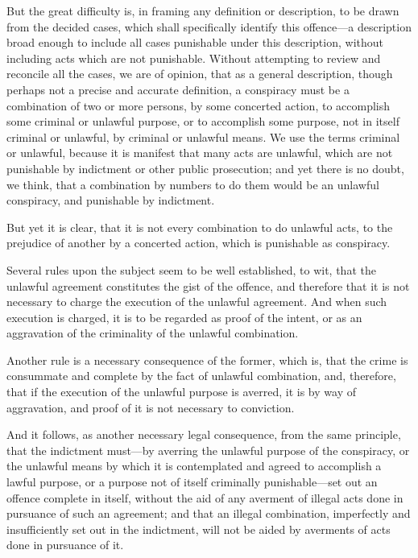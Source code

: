 \documentclass[
  letterpaper,
  11pt,
  DIV=9,
  openright]{scrbook}
\begin{document}
But the great difficulty is, in framing any definition or description,
to be drawn from the decided cases, which shall specifically identify
this offence---a description broad enough to include all cases
punishable under this description, without including acts which are not
punishable. Without attempting to review and reconcile all the cases, we
are of opinion, that as a general description, though perhaps not a
precise and accurate definition, a conspiracy must be a combination of
two or more persons, by some concerted action, to accomplish some
criminal or unlawful purpose, or to accomplish some purpose, not in
itself criminal or unlawful, by criminal or unlawful means. We use the
terms criminal or unlawful, because it is manifest that many acts are
unlawful, which are not punishable by indictment or other public
prosecution; and yet there is no doubt, we think, that a combination by
numbers to do them would be an unlawful conspiracy, and punishable by
indictment.

But yet it is clear, that it is not every combination to do unlawful
acts, to the prejudice of another by a concerted action, which is
punishable as conspiracy.

Several rules upon the subject seem to be well established, to wit, that
the unlawful agreement constitutes the gist of the offence, and
therefore that it is not necessary to charge the execution of the
unlawful agreement. And when such execution is charged, it is to be
regarded as proof of the intent, or as an aggravation of the criminality
of the unlawful combination.

Another rule is a necessary consequence of the former, which is, that
the crime is consummate and complete by the fact of unlawful
combination, and, therefore, that if the execution of the unlawful
purpose is averred, it is by way of aggravation, and proof of it is not
necessary to conviction.

And it follows, as another necessary legal consequence, from the same
principle, that the indictment must---by averring the unlawful purpose
of the conspiracy, or the unlawful means by which it is contemplated and
agreed to accomplish a lawful purpose, or a purpose not of itself
criminally punishable---set out an offence complete in itself, without
the aid of any averment of illegal acts done in pursuance of such an
agreement; and that an illegal combination, imperfectly and
insufficiently set out in the indictment, will not be aided by averments
of acts done in pursuance of it.
\end{document}

